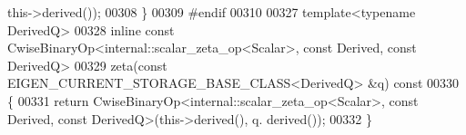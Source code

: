 \begin{DoxyCode}
      this->derived());
00308 \}
00309 \textcolor{preprocessor}{#endif}
00310 
00327 \textcolor{keyword}{template}<\textcolor{keyword}{typename} DerivedQ>
00328 \textcolor{keyword}{inline} \textcolor{keyword}{const} CwiseBinaryOp<internal::scalar\_zeta\_op<Scalar>, \textcolor{keyword}{const} Derived, \textcolor{keyword}{const} DerivedQ>
00329 zeta(\textcolor{keyword}{const} EIGEN\_CURRENT\_STORAGE\_BASE\_CLASS<DerivedQ> &q)\textcolor{keyword}{ const}
00330 \textcolor{keyword}{}\{
00331   \textcolor{keywordflow}{return} CwiseBinaryOp<internal::scalar\_zeta\_op<Scalar>, \textcolor{keyword}{const} Derived, \textcolor{keyword}{const} DerivedQ>(this->derived(), q.
      derived());
00332 \}
\end{DoxyCode}
